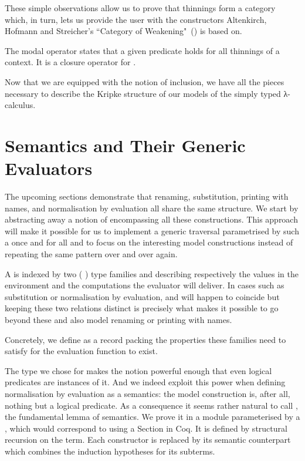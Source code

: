 These simple observations allow us to prove that thinnings
form a category which, in turn, lets us provide the user with the
constructors Altenkirch, Hofmann and Streicher's ``Category of
Weakening"~(\citeyear{altenkirch1995categorical}) is based on.

The modal operator  states that a given predicate holds for
all thinnings of a context. It is a closure operator for .

Now that we are equipped with the notion of inclusion, we have all
the pieces necessary to describe the Kripke structure of our models
of the simply typed λ-calculus.

\section{Semantics and Their Generic Evaluators}
\label{section:generic-semantics}
The upcoming sections demonstrate that renaming, substitution, printing with names,
and normalisation by evaluation all share the same structure. We start by abstracting
away a notion of  encompassing all these constructions. This approach
will make it possible for us to implement a generic traversal parametrised by such
a  once and for all and to focus on the interesting model constructions
instead of repeating the same pattern over and over again.

A  is indexed by two ( ) type families
 and  describing respectively the values in the environment
and the computations the evaluator will deliver. In cases such as substitution
or normalisation by evaluation,  and  will happen to coincide but
keeping these two relations distinct is precisely what makes it possible to go
beyond these and also model renaming or printing with names.

Concretely, we define  as a record packing the properties these
families need to satisfy for the evaluation function to exist.


The type we chose for  makes the  notion
powerful enough that even logical predicates are instances of it. And we
indeed exploit this power when defining normalisation by evaluation
as a semantics: the model construction is, after all, nothing but a logical
predicate. As a consequence it seems rather natural to call , the
fundamental lemma of semantics. We prove it in a module parameterised by a
, which would correspond to using a Section in Coq. It is
defined by structural recursion on the term. Each constructor is replaced
by its semantic counterpart which combines the induction hypotheses
for its subterms.

